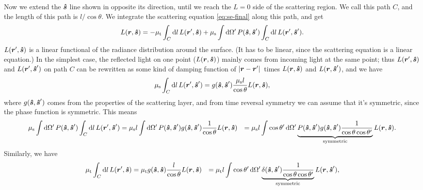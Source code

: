 \documentclass[hyperref, a4paper]{article}
\def\\{}%
\begin{document}
Now we extend the $\vu*{s}$ line shown in 
opposite its direction, until we reach the $L=0$ side of the scattering region.
We call this path $C$,
and the length of this path is $l / \cos \theta$.
We integrate the scattering equation \eqref{eq:se-final} along this path, 
and get 
\begin{equation}
    L(\vb*{r}, \vu*{s}) = - \mu_{\text{t}} \int_C \dd{l} L(\vb*{r}', \vu*{s})
    + \mu_{\text{s}} \int \dd{\Omega'} P(\vu*{s}, \vu*{s}') \int_C \dd{l} L(\vb*{r}', \vu*{s}') .
    \label{eq:re-1}
\end{equation}
$L(\vb*{r}', \vu*{s})$ is a linear functional of 
the radiance distribution around the surface. 
(It has to be linear, since the scattering equation is a linear equation.)
In the simplest case, the reflected light on one point ($L(\vb*{r}, \vu*{s})$)
mainly comes from incoming light at the same point; 
thus $L(\vb*{r}', \vu*{s})$ and $L(\vb*{r}', \vu*{s}')$ on path $C$ 
can be rewritten as some kind of damping function of $\abs*{\vb*{r} - \vb*{r}'}$ 
times $L(\vb*{r}, \vu*{s})$ and $L(\vb*{r}, \vu*{s}')$, 
and we have 
\[
    \mu_{\text{s}} \int_C \dd{l} L(\vb*{r}', \vu*{s}') 
    = g(\vu*{s}, \vu*{s}') \frac{\mu_{\text{s}} l}{\cos \theta} L(\vb*{r}, \vu*{s}),
\]
where $g(\vu*{s}, \vu*{s}')$ comes from 
the properties of the scattering layer, 
and from time reversal symmetry we can assume that it's symmetric, 
since the phase function is symmetric. 
This means 
\begin{equation}
    \begin{aligned}
        \mu_{\text{s}} \int \dd{\Omega'} P(\vu*{s}, \vu*{s}') \int_C \dd{l} L(\vb*{r}', \vu*{s}')
        &= \mu_{\text{s}} l \int \dd{\Omega'} P(\vu*{s}, \vu*{s}') 
        g(\vu*{s}, \vu*{s}') \frac{1}{\cos \theta} L(\vb*{r}, \vu*{s}) \\
        &= \mu_{\text{s}} l \int \cos \theta' \dd{\Omega'} 
        \underbrace{
            P(\vu*{s}, \vu*{s}') 
            g(\vu*{s}, \vu*{s}') \frac{1}{\cos \theta \cos \theta'}
        }_{\text{symmetric}} L(\vb*{r}, \vu*{s})  .
    \end{aligned}
\end{equation}
Similarly, we have 
\begin{equation}
    \begin{aligned}
        \mu_{\text{t}} \int_C \dd{l} L(\vb*{r}', \vu*{s})
        &= \mu_{\text{t}} g(\vu*{s}, \vu*{s}) \frac{l}{\cos \theta} L(\vb*{r}, \vu*{s}) \\
        &= \mu_{\text{t}} l \int \cos \theta' \dd{\Omega'} 
        \underbrace{
            \delta(\vu*{s}, \vu*{s}') \frac{1}{\cos \theta \cos \theta'}
        }_{\text{symmetric}} L(\vb*{r}, \vu*{s}'),
    \end{aligned}
\end{equation}
\end{document}
